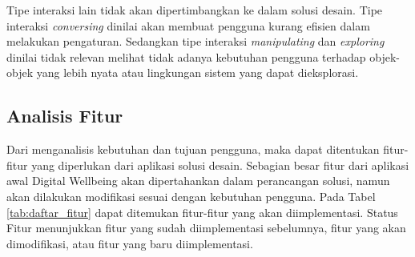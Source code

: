 Tipe interaksi lain tidak akan dipertimbangkan ke dalam solusi desain. Tipe interaksi \textit{conversing} dinilai akan membuat pengguna kurang efisien dalam melakukan pengaturan. Sedangkan tipe interaksi \textit{manipulating} dan \textit{exploring} dinilai tidak relevan melihat tidak adanya kebutuhan pengguna terhadap objek-objek yang lebih nyata atau lingkungan sistem yang dapat dieksplorasi.

\subsection{Analisis Fitur}
\label{subsec:analisis_fitur}

Dari menganalisis kebutuhan dan tujuan pengguna, maka dapat ditentukan fitur-fitur yang diperlukan dari aplikasi solusi desain. Sebagian besar fitur dari aplikasi awal Digital Wellbeing akan dipertahankan dalam perancangan solusi, namun akan dilakukan modifikasi sesuai dengan kebutuhan pengguna. Pada Tabel \ref{tab:daftar_fitur} dapat ditemukan fitur-fitur yang akan diimplementasi. Status Fitur menunjukkan fitur yang sudah diimplementasi sebelumnya, fitur yang akan dimodifikasi, atau fitur yang baru diimplementasi.


